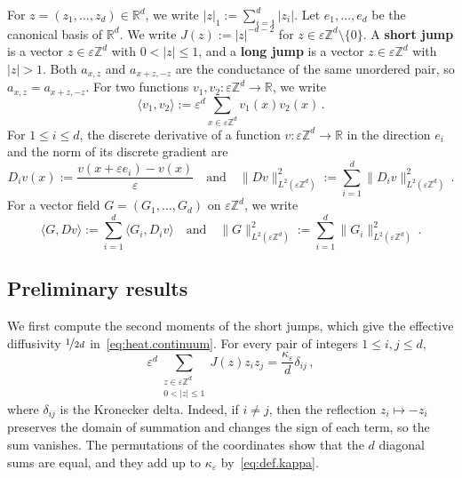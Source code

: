 \documentclass[11pt]{amsart}
\numberwithin{equation}{section}
\newcommand{\Z}{\mathbb{Z}}
\newcommand{\R}{\mathbb{R}}
\newcommand{\eps}{\varepsilon}
\newcommand{\nf}{\nicefrac}
\begin{document}
For $z = (z_1, \ldots, z_d) \in \R^d$, we write $|z|_1 := \sum_{i=1}^d |z_i|$.
Let $e_1, \ldots, e_d$ be the canonical basis of $\R^d$.
We write $J(z) := |z|^{-d-2}$ for $z \in \eps \Z^d \setminus \{0\}$.
A \textbf{short jump} is a vector $z \in \eps \Z^d$ with $0 < |z| \leq 1$, and a \textbf{long jump} is a vector $z \in \eps \Z^d$ with $|z| > 1$.
Both $a_{x,z}$ and $a_{x+z,-z}$ are the conductance of the same unordered pair, so $a_{x,z} = a_{x + z, -z}$.
For two functions $v_1, v_2 \colon \eps \Z^d \to \R$, we write
\begin{equation*}
    \langle v_1, v_2 \rangle := \eps^d \sum_{x \in \eps \Z^d} v_1(x) v_2(x)\,.
\end{equation*}
For $1 \leq i \leq d$, the discrete derivative of a function $v \colon \eps \Z^d \to \R$ in the direction $e_i$ and the norm of its discrete gradient are
\begin{equation*}
    D_i v(x) := \frac{v(x + \eps e_i) - v(x)}{\eps}
    \quad \text{and} \quad
    \|D v\|_{L^2(\eps \Z^d)}^2 := \sum_{i=1}^d \|D_i v\|_{L^2(\eps \Z^d)}^2\,.
\end{equation*}
For a vector field $G = (G_1, \ldots, G_d)$ on $\eps \Z^d$, we write
\begin{equation*}
    \langle G, D v \rangle := \sum_{i=1}^d \langle G_i, D_i v \rangle
    \quad \text{and} \quad
    \|G\|_{L^2(\eps \Z^d)}^2 := \sum_{i=1}^d \|G_i\|_{L^2(\eps \Z^d)}^2\,.
\end{equation*}

\subsection{Preliminary results} \label{sec:prelim}

We first compute the second moments of the short jumps, which give the effective diffusivity $\nf{1}{2d}$ in~\eqref{eq:heat.continuum}.
For every pair of integers $1 \leq i, j \leq d$,
\begin{equation} \label{eq:second.moment}
    \eps^d \sum_{\substack{z \in \eps \Z^d \\ 0 < |z| \leq 1}} J(z) z_i z_j = \frac{\kappa_\eps}{d} \delta_{ij}\,,
\end{equation}
where $\delta_{ij}$ is the Kronecker delta.
Indeed, if $i \neq j$, then the reflection $z_i \mapsto -z_i$ preserves the domain of summation and changes the sign of each term, so the sum vanishes.
The permutations of the coordinates show that the $d$ diagonal sums are equal, and they add up to $\kappa_\eps$ by~\eqref{eq:def.kappa}.
\end{document}

